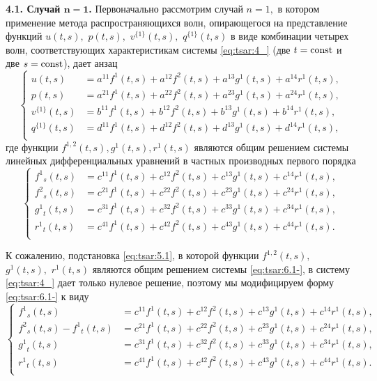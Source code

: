 \smallskip

\textbf {4.1. Случай $\boldsymbol{n=1}$.}
Первоначально рассмотрим случай $n=1,$ 
в котором применение метода распространяющихся волн, 
опирающегося на представление функций 
$u(t,s),$ $p(t,s),$ $v^{\{1\}}(t,s),$ $q^{\{1\}}(t,s)$ в виде комбинации четырех
волн, соответствующих характеристикам системы \eqref{eq:tsar:4_}
(две $t=\rm const$ и две $s=\rm const$), дает анзац
\begin{equation}
\left\{
\begin{aligned}
u(t,s) &= a^{11}{f^{1}}(t,s)+a^{12}{f^{2}}(t,s)+a^{13}{g^{1}}(t,s)+a^{14}{r^{1}}(t,s), \\
p(t,s) &= a^{21}{f^{1}}(t,s)+a^{22}{f^{2}}(t,s)+a^{23}{g^{1}}(t,s)+a^{24}{r^{1}}(t,s),\\
v^{\{1\}}(t,s) &= b^{11}{f^{1}}(t,s)+b^{12}{f^{2}}(t,s)+b^{13}{g^{1}}(t,s)+b^{14}{r^{1}}(t,s),\\
q^{\{1\}}(t,s) &= d^{11}{f^{1}}(t,s)+d^{12}{f^{2}}(t,s)+d^{13}{g^{1}}(t,s)+d^{14}{r^{1}}(t,s),\\
\end{aligned}
\right. \label{eq:tsar:5.1}
\end{equation}
где функции ${f^{1,2}}(t,s), g^{1}(t,s), r^{1}(t,s)$ являются общим решением системы линейных дифференциальных уравнений 
в частных производных первого порядка
\begin{equation}
\left\{
\begin{aligned}
{f^1}_s(t,s) &= c^{11}{f^1}(t,s)+c^{12}{f^2}(t,s)+c^{13}{g^{1}}(t,s)+c^{14}{r^{1}}(t,s), \\
{f^2}_s(t,s) &= c^{21}{f^1}(t,s)+c^{22}{f^2}(t,s)+c^{23}{g^{1}}(t,s)+c^{24}{r^{1}}(t,s),\\
{g^{1}}_t(t,s) &= c^{31}{f^1}(t,s)+c^{32}{f^2}(t,s)+c^{33}{g^{1}}(t,s)+c^{34}{r^{1}}(t,s),\\
{r^{1}}_t(t,s) &= c^{41}{f^1}(t,s)+c^{42}{f^2}(t,s)+c^{43}{g^{1}}(t,s)+c^{44}{r^{1}}(t,s).\\
\end{aligned}
\right. \label{eq:tsar:6.1-}
\end{equation}

К сожалению, подстановка \eqref{eq:tsar:5.1}, в которой функции 
${f^{1,2}}(t,s),$ ${g^{1}}(t,s),$ ${r^{1}}(t,s)$ 
являются общим решением системы 
\eqref{eq:tsar:6.1-}, в систему \eqref{eq:tsar:4_} 
дает только нулевое решение, поэтому мы модифицируем форму \eqref{eq:tsar:6.1-} 
к виду
\begin{equation}
\left\{
\begin{aligned}
{f^1}_s(t,s) &= c^{11}{f^1}(t,s)+c^{12}{f^2}(t,s)+c^{13}{g^{1}}(t,s)+c^{14}{r^{1}}(t,s), \\
{f^2}_s(t,s) - {f^1}_t(t,s)&= c^{21}{f^1}(t,s)+c^{22}{f^2}(t,s)+c^{23}{g^{1}}(t,s)+c^{24}{r^{1}}(t,s),\\
{g^{1}}_t(t,s) &= c^{31}{f^1}(t,s)+c^{32}{f^2}(t,s)+c^{33}{g^{1}}(t,s)+c^{34}{r^{1}}(t,s),\\
{r^{1}}_t(t,s) &= c^{41}{f^1}(t,s)+c^{42}{f^2}(t,s)+c^{43}{g^{1}}(t,s)+c^{44}{r^{1}}(t,s).\\
\end{aligned}
\right. \label{eq:tsar:6.1}
\end{equation}

